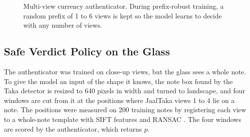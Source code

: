 \begin{figure}[H]
\centering
{}
\caption{Multi-view currency authenticator. During prefix-robust training, a random prefix of 1 to 6 views is kept so the model learns to decide with any number of views.}
\label{fig:auth_arch}
\end{figure}

\subsection{Safe Verdict Policy on the Glass}
\label{sec:safe_policy}
The authenticator was trained on close-up views, but the glass sees a whole note. To give the model an input of the shape it knows, the note box found by the Taka detector is resized to 640 pixels in width and turned to landscape, and four windows are cut from it at the positions where JaalTaka views 1 to 4 lie on a note. The positions were measured on 200 training notes by registering each view to a whole-note template with SIFT features \cite{sift} and RANSAC \cite{ransac}. The four windows are scored by the authenticator, which returns $p$.

